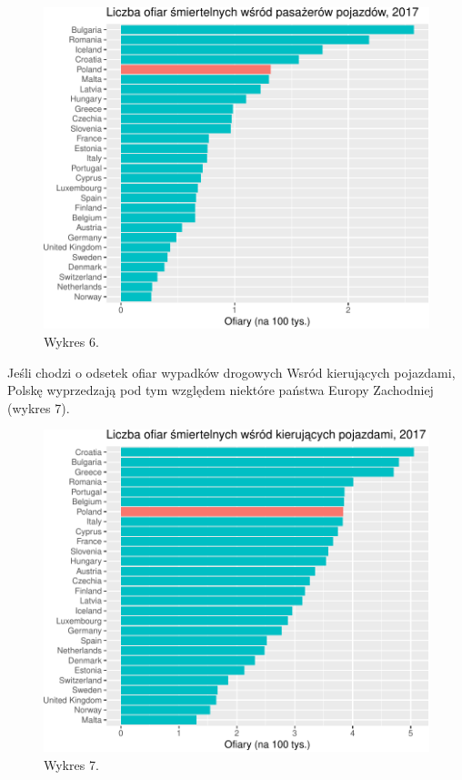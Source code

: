 \documentclass[
]{article}
\begin{document}
\begin{figure}

\includegraphics{raport_wypadki_files/figure-latex/unnamed-chunk-12-1} \hfill{}

\caption{Wykres 6.}\label{fig:unnamed-chunk-12}
\end{figure}

Jeśli chodzi o odsetek ofiar wypadków drogowych Wsród kierujących
pojazdami, Polskę wyprzedzają pod tym względem niektóre państwa Europy
Zachodniej (wykres 7).

\begin{figure}

\includegraphics{raport_wypadki_files/figure-latex/unnamed-chunk-13-1} \hfill{}

\caption{Wykres 7.}\label{fig:unnamed-chunk-13}
\end{figure}
\end{document}
